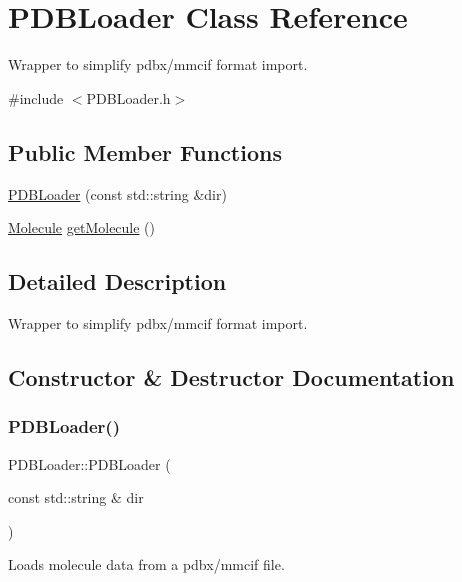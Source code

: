 \hypertarget{class_p_d_b_loader}{}\section{P\+D\+B\+Loader Class Reference}
\label{class_p_d_b_loader}


Wrapper to simplify pdbx/mmcif format import.  




{\ttfamily \#include $<$P\+D\+B\+Loader.\+h$>$}

\subsection*{Public Member Functions}
\begin{DoxyCompactItemize}
\item 
\mbox{\hyperlink{class_p_d_b_loader_a5b58a18a29849ec9799cb690a1fae6c3}{P\+D\+B\+Loader}} (const std\+::string \&dir)
\item 
\mbox{\hyperlink{struct_molecule}{Molecule}} \mbox{\hyperlink{class_p_d_b_loader_af65928b5d5035c212c2298f7533608ce}{get\+Molecule}} ()
\end{DoxyCompactItemize}


\subsection{Detailed Description}
Wrapper to simplify pdbx/mmcif format import. 



\subsection{Constructor \& Destructor Documentation}
\mbox{\label{class_p_d_b_loader_a5b58a18a29849ec9799cb690a1fae6c3}} 
\subsubsection{\texorpdfstring{PDBLoader()}{PDBLoader()}}
{\footnotesize\ttfamily P\+D\+B\+Loader\+::\+P\+D\+B\+Loader (\begin{DoxyParamCaption}\item[{const std\+::string \&}]{dir }\end{DoxyParamCaption})}

Loads molecule data from a pdbx/mmcif file.


